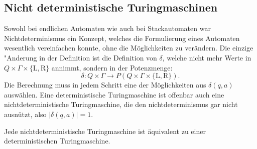 \subsection{Nicht deterministische Turingmaschinen}
Sowohl bei endlichen Automaten wie auch bei Stackautomaten war
Nichtdeterminismus ein Konzept, welches die Formulierung eines
Automaten wesentlich vereinfachen konnte, ohne die Möglichkeiten
zu verändern. Die einzige "Anderung in der Definition ist die
Definition von $\delta$, welche nicht mehr Werte in
$Q\times \Gamma\times\{\text{L},\text{R}\}$ annimmt, sondern
in der Potenzmenge:
\[
\delta\colon Q\times\Gamma\to
P(Q\times \Gamma\times\{\text{L},\text{R}\}).
\]
Die Berechnung muss in jedem Schritt eine der Möglichkeiten
aus $\delta(q,a)$ auswählen.
Eine deterministische Turingmaschine ist offenbar auch eine
nichtdeterministische Turingmaschine, die den nichtdeterminismus
gar nicht ausnützt, also $|\delta(q,a)|=1$.

\begin{satz}
\label{nichtdeterministischeturingmaschine}
Jede nichtdeterministische Turingmaschine ist äquivalent zu einer
deterministischen Turingmaschine.
\end{satz}

